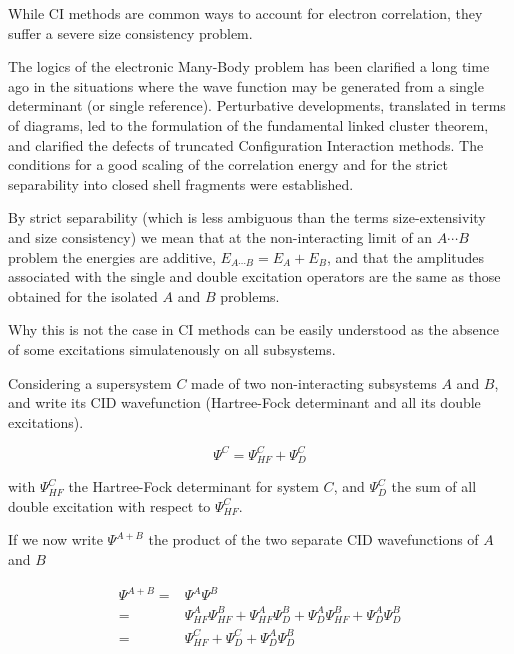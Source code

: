 \documentclass[./thesis.tex]{subfiles}
\begin{document}
\label{chap:exp_dressing}

While CI methods are common ways to account for electron correlation, they suffer a severe size consistency problem.


The logics of the electronic Many-Body problem has been clarified a long time
ago in the situations where  the  wave  function  may  be  generated  from  a
single  determinant  (or  single  reference).  Perturbative  developments,
translated  in  terms  of  diagrams,  led  to  the  formulation  of  the
fundamental  linked  cluster  theorem,\cite{Goldstone}  and  clarified  the  defects  of
truncated  Configuration Interaction  methods.  The  conditions  for  a  good
scaling  of  the  correlation  energy  and  for  the  strict separability  into
closed  shell  fragments  were  established.

By  strict  separability  (which
is  less ambiguous than the terms size-extensivity and size consistency) we
mean that at the non-interacting limit of an $A\cdots B$ problem the energies are
additive, $E_{A\cdots B} = E_A+E_B$, and that the amplitudes associated with the single
and  double excitation operators  are  the  same  as  those  obtained  for  the  isolated  $A$
and  $B$  problems.

Why this is not the case in CI methods can be easily understood as the absence of some excitations simulatenously on all subsystems.

Considering a supersystem $C$ made of two non-interacting subsystems $A$ and $B$, and write its CID wavefunction (Hartree-Fock determinant and all its double excitations).

\begin{equation}
\Psi^C = \Psi_{HF}^C + \Psi_{D}^C
\end{equation}

with $\Psi_{HF}^C$ the Hartree-Fock determinant for system $C$, and $\Psi_{D}^C$ the sum of all double excitation with respect to $\Psi_{HF}^C$.

If we now write $\Psi^{A+B}$ the product of the two separate CID wavefunctions of $A$ and $B$


\begin{align}
\Psi^{A+B} = & \Psi^A  \Psi^B \\
 = & \Psi_{HF}^A\Psi_{HF}^B  + \Psi_{HF}^A\Psi_{D}^B + \Psi_{D}^A\Psi_{HF}^B + \Psi_{D}^A \Psi_{D}^B \\
 = & \Psi^C_{HF} + \Psi^C_D + \Psi_{D}^A \Psi_{D}^B
\end{align}
\end{document}
